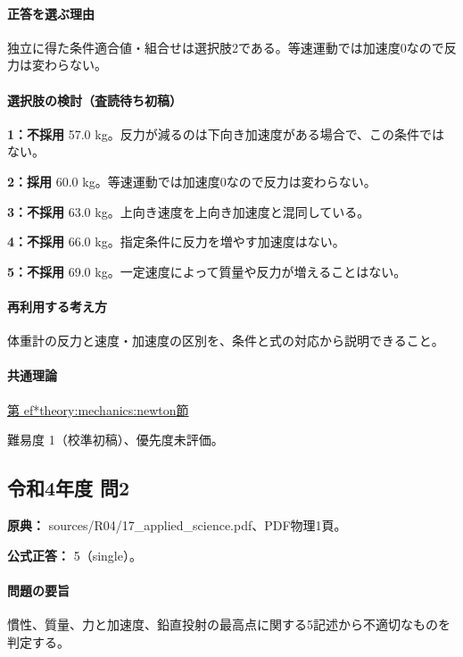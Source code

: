 \paragraph{正答を選ぶ理由} 独立に得た条件適合値・組合せは選択肢2である。等速運動では加速度0なので反力は変わらない。

\paragraph{選択肢の検討（査読待ち初稿）}

\noindent\textbf{1：不採用} 57.0 kg。反力が減るのは下向き加速度がある場合で、この条件ではない。\par

\noindent\textbf{2：採用} 60.0 kg。等速運動では加速度0なので反力は変わらない。\par

\noindent\textbf{3：不採用} 63.0 kg。上向き速度を上向き加速度と混同している。\par

\noindent\textbf{4：不採用} 66.0 kg。指定条件に反力を増やす加速度はない。\par

\noindent\textbf{5：不採用} 69.0 kg。一定速度によって質量や反力が増えることはない。\par

\paragraph{再利用する考え方} 体重計の反力と速度・加速度の区別を、条件と式の対応から説明できること。

\paragraph{共通理論} \hyperref[theory:mechanics:newton]{第
ef*{theory:mechanics:newton}節}

\par 難易度 1（校準初稿）、優先度未評価。

\subsection{令和4年度 問2}
\label{q:r04-reg-applied-02}

\noindent\textbf{原典：} sources/R04/17\_applied\_science.pdf、PDF物理1頁。

\textbf{公式正答：} 5（single）。

\paragraph{問題の要旨} 慣性、質量、力と加速度、鉛直投射の最高点に関する5記述から不適切なものを判定する。

